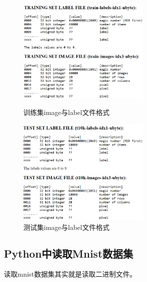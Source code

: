 \begin{figure}[htbp]
  \centering
  \begin{minipage}[t]{0.48\textwidth}
    \centering
    \includegraphics[width=6.5cm]{figure/Ch0Mnist/train.png}
    \caption{训练集image与label文件格式}
    \label{fig:ch0_train}
  \end{minipage}
  \begin{minipage}[t]{0.48\textwidth}
    \centering
    \includegraphics[width=6.5cm]{figure/Ch0Mnist/test.png}
    \caption{测试集image与label文件格式}
    \label{fig:ch0_test}
  \end{minipage}
\end{figure}

\subsection{Python中读取Mnist数据集}
读取mnist数据集其实就是读取二进制文件。
